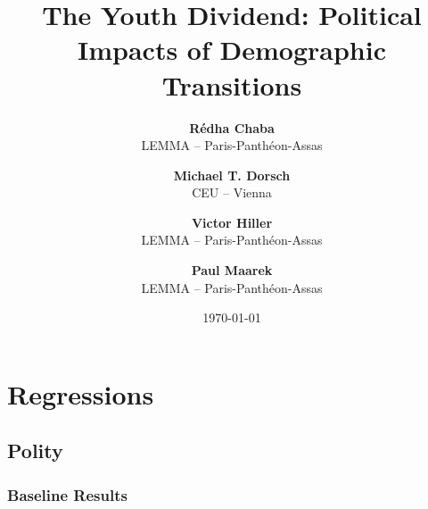 \documentclass[11pt]{article}
\begin{document}
\title{The Youth Dividend: Political Impacts of Demographic Transitions}

\author{
\textbf{R\'{e}dha Chaba} \\ LEMMA -- Paris-Panthéon-Assas  \\
\and \textbf{Michael T. Dorsch}
  \\ CEU -- Vienna 
\and \textbf{Victor Hiller} \\ LEMMA -- Paris-Panthéon-Assas \\ 
\and \textbf{Paul Maarek}   \\ LEMMA -- Paris-Panthéon-Assas  \\  
}
\date{\today}

\maketitle
\tableofcontents
\section{Regressions}
\subsection{Polity}
\subsubsection{Baseline Results}
\end{document}
